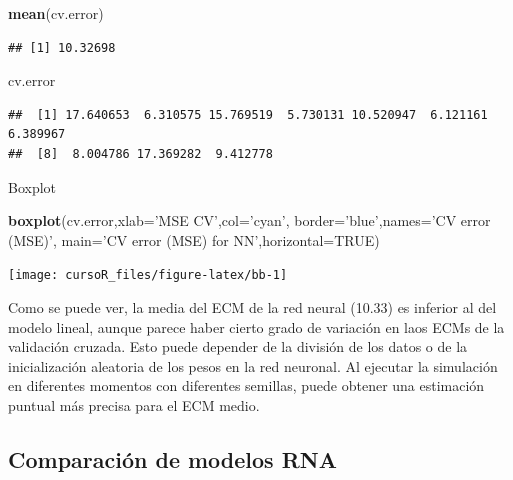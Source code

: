 \documentclass[]{book}
\newenvironment{Shaded}{\begin{snugshade}}{\end{snugshade}}
\newcommand{\KeywordTok}[1]{\textcolor[rgb]{0.13,0.29,0.53}{\textbf{#1}}}
\newcommand{\DataTypeTok}[1]{\textcolor[rgb]{0.13,0.29,0.53}{#1}}
\newcommand{\StringTok}[1]{\textcolor[rgb]{0.31,0.60,0.02}{#1}}
\newcommand{\OtherTok}[1]{\textcolor[rgb]{0.56,0.35,0.01}{#1}}
\newcommand{\NormalTok}[1]{#1}
\begin{document}
\begin{Shaded}
\begin{Highlighting}[]
\KeywordTok{mean}\NormalTok{(cv.error)}
\end{Highlighting}
\end{Shaded}

\begin{verbatim}
## [1] 10.32698
\end{verbatim}

\begin{Shaded}
\begin{Highlighting}[]
\NormalTok{cv.error}
\end{Highlighting}
\end{Shaded}

\begin{verbatim}
##  [1] 17.640653  6.310575 15.769519  5.730131 10.520947  6.121161  6.389967
##  [8]  8.004786 17.369282  9.412778
\end{verbatim}

Boxplot

\begin{Shaded}
\begin{Highlighting}[]
\KeywordTok{boxplot}\NormalTok{(cv.error,}\DataTypeTok{xlab=}\StringTok{'MSE CV'}\NormalTok{,}\DataTypeTok{col=}\StringTok{'cyan'}\NormalTok{,}
        \DataTypeTok{border=}\StringTok{'blue'}\NormalTok{,}\DataTypeTok{names=}\StringTok{'CV error (MSE)'}\NormalTok{,}
        \DataTypeTok{main=}\StringTok{'CV error (MSE) for NN'}\NormalTok{,}\DataTypeTok{horizontal=}\OtherTok{TRUE}\NormalTok{)}
\end{Highlighting}
\end{Shaded}

\begin{center}\texttt{[image: cursoR\_files/figure-latex/bb-1]} \end{center}

Como se puede ver, la media del ECM de la red neural (10.33) es inferior
al del modelo lineal, aunque parece haber cierto grado de variación en
laos ECMs de la validación cruzada. Esto puede depender de la división
de los datos o de la inicialización aleatoria de los pesos en la red
neuronal. Al ejecutar la simulación en diferentes momentos con
diferentes semillas, puede obtener una estimación puntual más precisa
para el ECM medio.

\subsection{Comparación de modelos
RNA}\label{comparaciuxf3n-de-modelos-rna}
\end{document}
